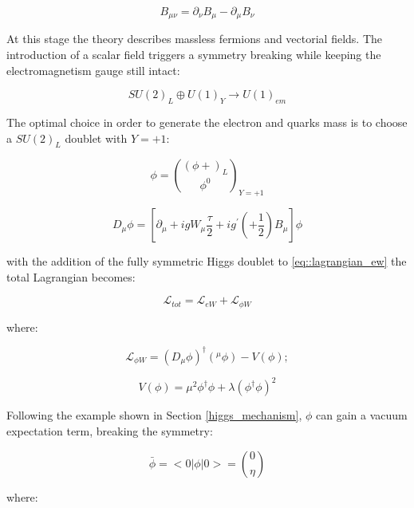 \begin{equation}
B_{\mu\nu} =\partial_{\nu}B_{\mu} - \partial_{\mu}B_{\nu} 
\end{equation}

At this stage the theory describes massless fermions and vectorial fields. The introduction of a scalar field triggers a symmetry breaking while keeping the electromagnetism gauge still intact:

\begin{equation}
SU(2)_{L} \oplus U(1)_{Y} \rightarrow U(1)_{em}
\end{equation}

The optimal choice in order to generate the electron and quarks mass is to choose a $SU(2)_{L}$ doublet with $Y = +1$: 

\begin{equation}
\phi = \binom{(\phi{+})_{L}}{\phi^{0}}_{Y=+1}
\label{eq::su2_doublet}
\end{equation}

\begin{equation}
D_{\mu}\phi = [\partial_{\mu} + igW_{\mu} \dfrac{\tau}{2}  + ig^{\prime}(+\dfrac{1}{2})B_{\mu}]\phi 
\end{equation}


with the addition of the fully symmetric Higgs doublet to \ref{eq::lagrangian_ew} the total Lagrangian becomes:

\begin{equation}
\mathcal{L}_{tot} = \mathcal{L}_{eW} + \mathcal{L}_{\phi W}
\end{equation}

where:

\begin{equation}
\mathcal{L}_{\phi W} = (D_{\mu}\phi)^{\dagger} (^{\mu}\phi) - V (\phi);
\label{eq::lagrangian_phiW}
\end{equation}

\begin{equation}
V(\phi) = \mu^{2}\phi^{\dagger}\phi + \lambda(\phi^{\dagger}\phi)^{2}
\end{equation}

Following the example shown in Section \ref{higgs_mechanism}, $\phi$ can gain a vacuum expectation term, breaking the symmetry:

\begin{equation}
 \bar{\phi}= < 0|\phi|0 > = \binom{0}{\eta}
 \label{eq::vacuum_expectation}
\end{equation}

where:

